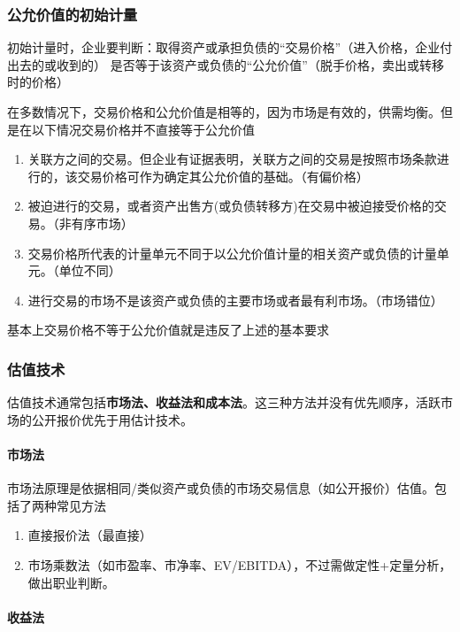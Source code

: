 \documentclass[UTF8,12pt]{ctexart}
\numberwithin{equation}{section} %
\numberwithin{figure}{section}
\numberwithin{table}{section}
\begin{document}
	\subsubsection{公允价值的初始计量}
	
	初始计量时，企业要判断：取得资产或承担负债的“交易价格”（进入价格，企业付出去的或收到的） 是否等于该资产或负债的“公允价值”（脱手价格，卖出或转移时的价格）

	在多数情况下，交易价格和公允价值是相等的，因为市场是有效的，供需均衡。但是在以下情况交易价格并不直接等于公允价值
	\begin{enumerate}
		\item 关联方之间的交易。但企业有证据表明，关联方之间的交易是按照市场条款进行的，该交易价格可作为确定其公允价值的基础。（有偏价格）
		
		\item 被迫进行的交易，或者资产出售方(或负债转移方)在交易中被迫接受价格的交易。（非有序市场）
		
		\item 交易价格所代表的计量单元不同于以公允价值计量的相关资产或负债的计量单元。（单位不同）
		
		\item 进行交易的市场不是该资产或负债的主要市场或者最有利市场。（市场错位）
	\end{enumerate}
	
	基本上交易价格不等于公允价值就是违反了上述的基本要求

	\subsubsection{估值技术}
	估值技术通常包括\textbf{市场法、收益法和成本法}。这三种方法并没有优先顺序，活跃市场的公开报价优先于用估计技术。
	
	\paragraph{市场法}
	市场法原理是依据相同/类似资产或负债的市场交易信息（如公开报价）估值。包括了两种常见方法
	\begin{enumerate}
		\item 直接报价法（最直接）
		
		\item 市场乘数法（如市盈率、市净率、EV/EBITDA），不过需做定性+定量分析，做出职业判断。
	\end{enumerate}
	
	\paragraph{收益法}
	
\end{document}
